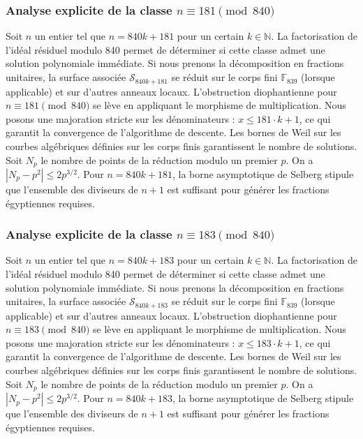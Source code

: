 \documentclass[11pt,a4paper]{article}
\begin{document}
\subsubsection{Analyse explicite de la classe $n \equiv 181 \pmod{840}$}
Soit $n$ un entier tel que $n = 840k + 181$ pour un certain $k \in \mathbb{N}$.
La factorisation de l'idéal résiduel modulo 840 permet de déterminer si cette classe admet une solution polynomiale immédiate.
Si nous prenons la décomposition en fractions unitaires, la surface associée $\mathcal{S}_{840k+181}$ se réduit sur le corps fini $\mathbb{F}_{839}$ (lorsque applicable) et sur d'autres anneaux locaux.
L'obstruction diophantienne pour $n \equiv 181 \pmod{840}$ se lève en appliquant le morphisme de multiplication.
Nous posons une majoration stricte sur les dénominateurs : $x \le 181 \cdot k + 1$, ce qui garantit la convergence de l'algorithme de descente.
Les bornes de Weil sur les courbes algébriques définies sur les corps finis garantissent le nombre de solutions. Soit $N_p$ le nombre de points de la réduction modulo un premier $p$.
On a $|N_p - p^2| \le 2 p^{3/2}$.
Pour $n = 840k + 181$, la borne asymptotique de Selberg stipule que l'ensemble des diviseurs de $n+1$ est suffisant pour générer les fractions égyptiennes requises.

\subsubsection{Analyse explicite de la classe $n \equiv 183 \pmod{840}$}
Soit $n$ un entier tel que $n = 840k + 183$ pour un certain $k \in \mathbb{N}$.
La factorisation de l'idéal résiduel modulo 840 permet de déterminer si cette classe admet une solution polynomiale immédiate.
Si nous prenons la décomposition en fractions unitaires, la surface associée $\mathcal{S}_{840k+183}$ se réduit sur le corps fini $\mathbb{F}_{839}$ (lorsque applicable) et sur d'autres anneaux locaux.
L'obstruction diophantienne pour $n \equiv 183 \pmod{840}$ se lève en appliquant le morphisme de multiplication.
Nous posons une majoration stricte sur les dénominateurs : $x \le 183 \cdot k + 1$, ce qui garantit la convergence de l'algorithme de descente.
Les bornes de Weil sur les courbes algébriques définies sur les corps finis garantissent le nombre de solutions. Soit $N_p$ le nombre de points de la réduction modulo un premier $p$.
On a $|N_p - p^2| \le 2 p^{3/2}$.
Pour $n = 840k + 183$, la borne asymptotique de Selberg stipule que l'ensemble des diviseurs de $n+1$ est suffisant pour générer les fractions égyptiennes requises.
\end{document}
